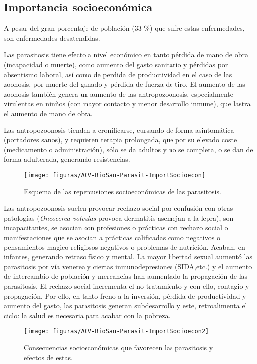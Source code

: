 \documentclass[10pt,a4paper,onecolumn,openany]{book}
\begin{document}
\subsection{Importancia socioeconómica}
A pesar del gran porcentaje de población (33 \%) que sufre estas enfermedades, son enfermedades desatendidas.
\begin{multicols}{2}
	Las parasitosis tiene efecto a nivel económico en tanto pérdida de mano de obra (incapacidad o muerte), como aumento del gasto sanitario y pérdidas por absentismo laboral, así como de perdida de productividad en el caso de las zoonosis, por muerte del ganado y pérdida de fuerza de tiro. El aumento de las zoonosis también genera un aumento de las antropozoonosis, especialmente virulentas en ninños (con mayor contacto y menor desarrollo inmune), que lastra el aumento de mano de obra.
	
	Las antropozoonosis tienden a cronificarse, cursando de forma asintomática (portadores sanos), y requieren terapia prolongada, que por su elevado coste (medicamento o administración), sólo se da adultos y no se completa, o se dan de forma adulterada, generando resistencias.
	\columnbreak
	\begin{figure}[H]
		\centering
		\texttt{[image: figuras/ACV-BioSan-Parasit-ImportSocioecon]}
		\caption{Esquema de las repercusiones socioeconómicas de las parasitosis.\label{fig:PARASIT:ConsecSocioecon}}
	\end{figure}
\end{multicols}
Las antropozoonosis suelen provocar rechazo social por confusión con otras patologías (\textit{Oncocerca volvulas} provoca dermatitis asemejan a la lepra), son incapacitantes, se asocian con profesiones o prácticas con rechazo social o manifestaciones que se asocian a prácticas calificadas como negativos o pensamientos magico-religiosos negativos o problemas de nutrición. Acaban, en infantes, generando retraso físico y mental. La mayor libertad sexual aumentó las parasitosis por vía venerea y ciertas inmunodepresiones (SIDA,etc.) y el aumento de intercambio de población y mercancías han aumentado la propagación de las parasitosis. El rechazo social incrementa el no tratamiento y con ello, contagio y propagación. Por ello, en tanto freno a la inversión, pérdida de productividad y aumento del gasto, las parasitosis generan subdesarrollo y este, retroalimenta el ciclo: la salud es necesaria para acabar con la pobreza.
\begin{figure}[H]
	\centering
	\texttt{[image: figuras/ACV-BioSan-Parasit-ImportSocioecon2]}
	\caption{Consecuencias socioeconómicas que favorecen las parasitosis y efectos de estas.\label{fig:PARASIT:ConsecSocioecon2}}
\end{figure}
\end{document}
